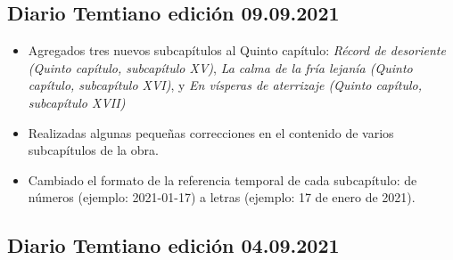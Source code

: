 \documentclass[
]{book}
\begin{document}
\hypertarget{diario-temtiano-ediciuxf3n-09.09.2021}{%
\subsection*{Diario Temtiano edición 09.09.2021}\label{diario-temtiano-ediciuxf3n-09.09.2021}}

\begin{itemize}
\item
  Agregados tres nuevos subcapítulos al Quinto capítulo: \emph{Récord de desoriente (Quinto capítulo, subcapítulo XV)}, \emph{La calma de la fría lejanía (Quinto capítulo, subcapítulo XVI)}, y \emph{En vísperas de aterrizaje (Quinto capítulo, subcapítulo XVII)}
\item
  Realizadas algunas pequeñas correcciones en el contenido de varios subcapítulos de la obra.
\item
  Cambiado el formato de la referencia temporal de cada subcapítulo: de números (ejemplo: 2021-01-17) a letras (ejemplo: 17 de enero de 2021).
\end{itemize}

\hypertarget{diario-temtiano-ediciuxf3n-04.09.2021}{%
\subsection*{Diario Temtiano edición 04.09.2021}\label{diario-temtiano-ediciuxf3n-04.09.2021}}
\end{document}
